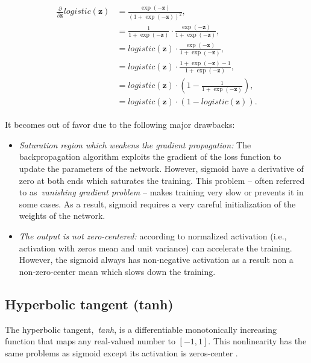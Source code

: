 \begin{align}\label{eq:logistic_derivative}
\begin{split}%
    \frac{\partial}{\partial \mathbf{z}}logistic(\mathbf{z}) &=
        \frac{\exp(\mathbf{-z})}{\left(1+\exp(-\mathbf{z})\right)^2} ,\\
    &= \frac{1}{1+\exp(-\mathbf{z})} \cdot
        \frac{\exp(-\mathbf{z})}{1+\exp(-\mathbf{z})} ,\\
    &= logistic(\mathbf{z}) \cdot
        \frac{\exp(-\mathbf{z})}{1+\exp(-\mathbf{z})} ,\\
    &= logistic(\mathbf{z}) \cdot
        \frac{1+\exp(-\mathbf{z})-1}{1+\exp(-\mathbf{z})} ,\\
    &= logistic(\mathbf{z}) \cdot
        \left(1-\frac{1}{1+\exp(-\mathbf{z})}\right) ,\\
    &= logistic(\mathbf{z}) \cdot (1-logistic(\mathbf{z})).
\end{split}
\end{align}

It becomes out of favor due to the following major drawbacks\cite{simonyan2014very}\cite{he2016deep}:
\begin{itemize}
    \item \emph{Saturation region which weakens the gradient propagation:}
        The backpropagation algorithm exploits the gradient of the loss function to update the parameters of the network. 
        However, sigmoid have a derivative of zero at both ends which saturates the training. This problem -- often referred to as~\emph{vanishing gradient problem} -- makes training very slow or prevents it in some cases. As a result, sigmoid requires a very careful initialization of the weights of the network.
    \item \emph{The output is not zero-centered:} 
    according to \cite{ioffe2015batch} normalized activation (i.e., activation with zeros mean and unit variance) can accelerate the training. However, the sigmoid always has non-negative activation as a result non a non-zero-center mean which slows down the training.
\end{itemize}

\subsection{Hyperbolic tangent (tanh)}\label{sec:tanh}

The hyperbolic tangent,~\emph{tanh}, is a differentiable monotonically increasing function that maps any real-valued number to $[-1, 1]$. This nonlinearity has the same problems as sigmoid except its activation is zeros-center \cite{sharma2017activation}.

